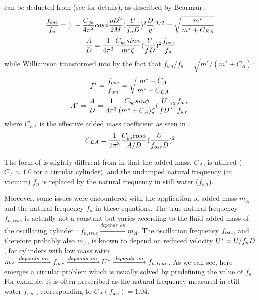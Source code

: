  can be deducted from  (see  for details), as described by Bearman \cite{bearman1984}:
\begin{equation}	\label{eq:4}
	\frac{f_{osc}}{f_n}=[1-\frac{C_{y_0}}{4\pi^2}cos\phi\frac{\rho D^2}{2M}(\frac{U}{f_nD})^2\frac{D}{y}]^{1/2}=\sqrt{\frac{m^*}{m^*+C_{EA}}}
\end{equation}
\begin{equation}	\label{eq:5}
\frac{A}{D}=\frac{1}{4 \pi ^3}  \frac{ C_{y_0} sin \phi}{m^* \zeta} (\frac{U}{fD})^2 \frac{f_{osc}}{f_{n}}
\end{equation}
while Williamson \cite{Williamson2004} transformed  into  by the fact that $ f_{wn}/f_n=\sqrt{m^*/(m^*+C_A)} $:
\begin{equation}	\label{eq:6a}
f^*=\frac{f_{osc}}{f_{wn}}=\sqrt{\frac{m^*+C_A}{m^*+C_{EA}}}
\end{equation}
\begin{equation}	\label{eq:6}
A^*=\frac{A}{D}=\frac{1}{4 \pi ^3}  \frac{ C_{y_0} sin \phi}{(m^* + C_A)\zeta} (\frac{U}{fD})^2 \frac{f_{osc}}{f_{wn}}
\end{equation}
where $C_{EA}$ is the effective added mass coefficient as seen in :
\begin{equation}	\label{eq:7}
C_{EA}=\frac{1}{2 \pi ^3}  \frac{ C_{y_0} cos \phi}{A/D} (\frac{U}{f_{osc} D})^2 
\end{equation}

The form of  is slightly different from  in that the added mass, $C_A$, is utilised ($C_A\approx1.0$ for a circular cylinder), and the undamped natural frequency (in vacuum) $f_n$ is replaced by the natural frequency in still water ($f_{wn}$). %

Moreover, some issues were encountered with the application of added mass $m_A$ and the natural frequency $ f_n $ in these equations. The true natural frequency $ f_{n,true} $ is actually not a constant but varies according to the fluid added mass of the oscillating cylinder \cite{VIKESTAD2000}: $f_{n,true} \xrightarrow{depends \,\,\, on }m_A$. The oscillation frequency $ f_{osc} $, and therefore probably also $m_A$, is known to depend on reduced velocity $ U^*=U/f_nD $, for cylinders with low mass ratio\cite{Sarpkaya1979}: $m_A \xrightarrow{depends \,\,\, on} f_{osc} \xrightarrow{depends \,\,\, on} U^* \xrightarrow{depends \,\,\, on} f_{n,true} $. As we can see, here emerges a circular problem which is usually solved by predefining the value of $ f_n $. For example, it is often prescribed as the natural frequency measured in still water $ f_{wn }$ \cite{Williamson2004,VIKESTAD2000}, corresponding to $ C_A(f_{wn })=1.04 $.

